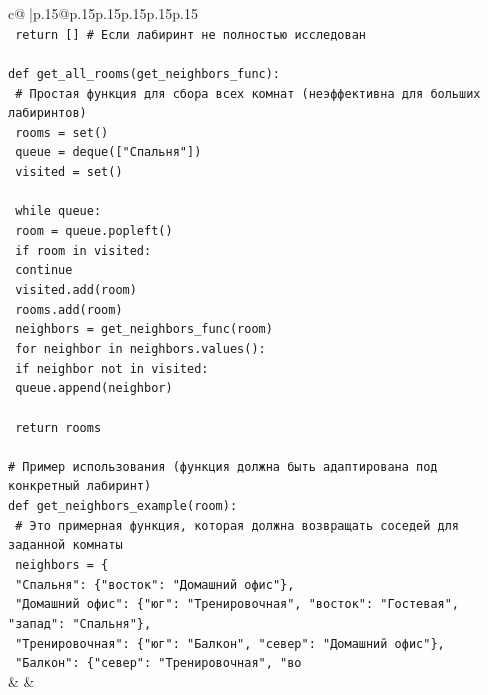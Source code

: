\documentclass{article}
\begin{document}
{\begin{supertabular}{c@{$\;$}|p{.15\linewidth}@{}p{.15\linewidth}p{.15\linewidth}p{.15\linewidth}p{.15\linewidth}p{.15\linewidth}}
{{{\\ 
\texttt{    return {[}{]}  \# Если лабиринт не полностью исследован} \\
\\ 
\texttt{def get\_all\_rooms(get\_neighbors\_func):} \\
\texttt{    \# Простая функция для сбора всех комнат (неэффективна для больших лабиринтов)} \\
\texttt{    rooms = set()} \\
\texttt{    queue = deque({[}"Спальня"{]})} \\
\texttt{    visited = set()} \\
\\ 
\texttt{    while queue:} \\
\texttt{        room = queue.popleft()} \\
\texttt{        if room in visited:} \\
\texttt{            continue} \\
\texttt{        visited.add(room)} \\
\texttt{        rooms.add(room)} \\
\texttt{        neighbors = get\_neighbors\_func(room)} \\
\texttt{        for neighbor in neighbors.values():} \\
\texttt{            if neighbor not in visited:} \\
\texttt{                queue.append(neighbor)} \\
\\ 
\texttt{    return rooms} \\
\\ 
\texttt{\# Пример использования (функция должна быть адаптирована под конкретный лабиринт)} \\
\texttt{def get\_neighbors\_example(room):} \\
\texttt{    \# Это примерная функция, которая должна возвращать соседей для заданной комнаты} \\
\texttt{    neighbors = \{} \\
\texttt{        "Спальня": \{"восток": "Домашний офис"\},} \\
\texttt{        "Домашний офис": \{"юг": "Тренировочная", "восток": "Гостевая", "запад": "Спальня"\},} \\
\texttt{        "Тренировочная": \{"юг": "Балкон", "север": "Домашний офис"\},} \\
\texttt{        "Балкон": \{"север": "Тренировочная", "во} \\
            }
        }
    }
    & & \\ \\


\end{supertabular}}
\end{document}
